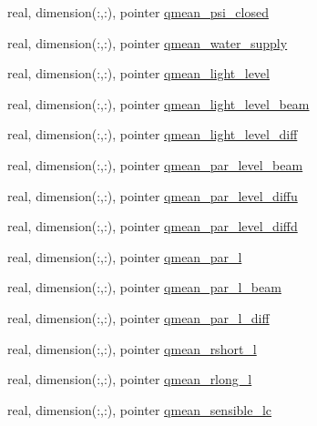 \begin{DoxyCompactItemize}
\item 
real, dimension(\+:,\+:), pointer \hyperlink{structed__state__vars_1_1patchtype_ab5c3f7778d25eef546ba1a2aa729633c}{qmean\+\_\+psi\+\_\+closed}
\item 
real, dimension(\+:,\+:), pointer \hyperlink{structed__state__vars_1_1patchtype_a4e7b43f9caab141f42e37edf9f9be413}{qmean\+\_\+water\+\_\+supply}
\item 
real, dimension(\+:,\+:), pointer \hyperlink{structed__state__vars_1_1patchtype_a2b2298cdb2de1deb3dde595eccff282c}{qmean\+\_\+light\+\_\+level}
\item 
real, dimension(\+:,\+:), pointer \hyperlink{structed__state__vars_1_1patchtype_ac96fbc9125a44bff11bc74b7bec2cee1}{qmean\+\_\+light\+\_\+level\+\_\+beam}
\item 
real, dimension(\+:,\+:), pointer \hyperlink{structed__state__vars_1_1patchtype_a72a52e503593afcf385c6918c2d9c93c}{qmean\+\_\+light\+\_\+level\+\_\+diff}
\item 
real, dimension(\+:,\+:), pointer \hyperlink{structed__state__vars_1_1patchtype_a6190e432e8458a2d61b8efbbc231cc34}{qmean\+\_\+par\+\_\+level\+\_\+beam}
\item 
real, dimension(\+:,\+:), pointer \hyperlink{structed__state__vars_1_1patchtype_aaae03dac89d5959b5bb7dfa1ea782c71}{qmean\+\_\+par\+\_\+level\+\_\+diffu}
\item 
real, dimension(\+:,\+:), pointer \hyperlink{structed__state__vars_1_1patchtype_a6ba1b22ed3a523d7a0ab0968775e4550}{qmean\+\_\+par\+\_\+level\+\_\+diffd}
\item 
real, dimension(\+:,\+:), pointer \hyperlink{structed__state__vars_1_1patchtype_a427050bde8467240712a31e5cb76f718}{qmean\+\_\+par\+\_\+l}
\item 
real, dimension(\+:,\+:), pointer \hyperlink{structed__state__vars_1_1patchtype_a1cf1232c9b2861d094f4bdcfdeeeba8a}{qmean\+\_\+par\+\_\+l\+\_\+beam}
\item 
real, dimension(\+:,\+:), pointer \hyperlink{structed__state__vars_1_1patchtype_ab0f7b1d3bbc9044f85a6f4f568b0ee8b}{qmean\+\_\+par\+\_\+l\+\_\+diff}
\item 
real, dimension(\+:,\+:), pointer \hyperlink{structed__state__vars_1_1patchtype_a462aa978894e20d88604422b66cc802a}{qmean\+\_\+rshort\+\_\+l}
\item 
real, dimension(\+:,\+:), pointer \hyperlink{structed__state__vars_1_1patchtype_ac835a0ec9d341a3dac6a0d3f8873105d}{qmean\+\_\+rlong\+\_\+l}
\item 
real, dimension(\+:,\+:), pointer \hyperlink{structed__state__vars_1_1patchtype_ae427f41f03a814501b060c920f131633}{qmean\+\_\+sensible\+\_\+lc}

\end{DoxyCompactItemize}
